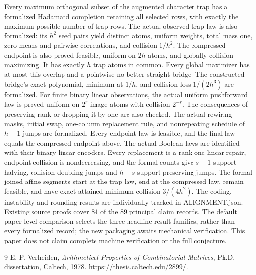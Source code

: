 \documentclass[11pt]{article}
\begin{document}
Every maximum orthogonal subset of the augmented character trap has a
formalized Hadamard completion retaining all selected rows, with exactly
the maximum possible number of trap rows. The actual observed trap law
is also formalized: its $h^2$ seed pairs yield distinct atoms, uniform
weights, total mass one, zero means and pairwise correlations, and
collision $1/h^2$. The compressed endpoint is also proved feasible,
uniform on $2h$ atoms, and globally collision-maximizing. It has exactly
$h$ trap atoms in common. Every global maximizer has at most this
overlap and a pointwise no-better straight bridge. The constructed
bridge's exact polynomial, minimum at $1/h$, and collision loss
$1/(2h^3)$ are formalized. For finite binary linear observations, the
actual uniform pushforward law is proved uniform on $2^r$ image atoms
with collision $2^{-r}$. The consequences of preserving rank or
dropping it by one are also checked. The actual rewiring masks, initial
swap, one-column replacement rule, and nonrepeating schedule of $h-1$
jumps are formalized. Every endpoint law is feasible, and the final law
equals the compressed endpoint above. The actual Boolean laws are
identified with their binary linear encoders. Every replacement is a
rank-one linear repair, endpoint collision is nondecreasing, and the
formal counts give $s-1$ support-halving, collision-doubling jumps and
$h-s$ support-preserving jumps. The formal joined affine segments start at
the trap law, end at the compressed law, remain feasible, and have exact
attained minimum collision $3/(4h^2)$.
The coding, instability and rounding results are individually tracked in
ALIGNMENT.json. Existing source proofs cover 84 of the 89 principal claim
records. The default paper-level comparison selects the three headline
result families, rather than every formalized record; the new packaging
awaits mechanical verification.
This paper does not claim complete machine verification or the full conjecture.






























\begin{thebibliography}{9}
 E. P. Verheiden, \emph{Arithmetical Properties of Combinatorial Matrices}, Ph.D. dissertation, Caltech, 1978. \url{https://thesis.caltech.edu/2899/}.
\end{thebibliography}




\end{document}
